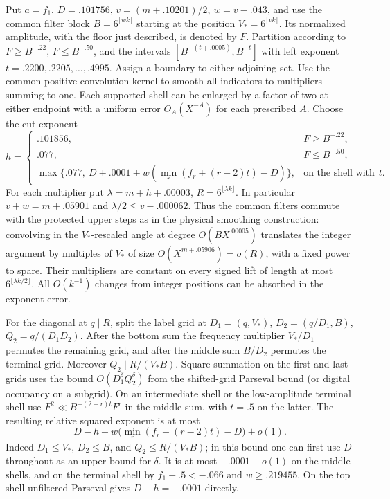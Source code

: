 \documentclass[11pt,a4paper]{article}
\theoremstyle{paperplain}
\numberwithin{equation}{section}
\begin{document}
Put $a=f_1$, $D=.101756$, $v=(m+.10201)/2$, $w=v-.043$, and use
the common filter block $B=6^{\lfloor wk\rfloor}$ starting at the
position $V_*=6^{\lfloor vk\rfloor}$. Its normalized amplitude,
with the floor just described, is denoted by $F$. Partition according
to $F\ge B^{-.22}$, $F\le B^{-.50}$, and the intervals
$[B^{-(t+.0005)},B^{-t}]$ with left exponent
$t=.2200,.2205,\ldots,.4995$. Assign a boundary to either adjoining
set. Use the common positive convolution kernel to smooth all
indicators to multipliers summing to one. Each supported shell can be
enlarged by a factor of two at either endpoint with a uniform error
$O_A(X^{-A})$ for each prescribed $A$. Choose the cut exponent
\[
 h=
 \begin{cases}
 .101856,& F\ge B^{-.22},\\
 .077,& F\le B^{-.50},\\
 \max\{.077,\ D+.0001+
  w(\min_r(f_r+(r-2)t)-D)\},&\text{on the shell with left exponent }t .
 \end{cases}
\]
For each multiplier put $\lambda=m+h+.00003$,
$R=6^{\lfloor\lambda k\rfloor}$. In particular $v+w=m+.05901$
and $\lambda/2\le v-.000062$. Thus the common filters commute with the
protected upper steps as in the physical smoothing construction:
convolving in the $V_*$-rescaled angle at degree $O(BX^{.00005})$
translates the integer argument by multiples of $V_*$ of size
$O(X^{m+.05906})=o(R)$, with a fixed power to spare. Their
multipliers are constant on every signed lift of length at most
$6^{\lfloor\lambda k/2\rfloor}$. All $O(k^{-1})$ changes from
integer positions can be absorbed in the exponent error.

For the diagonal at $q\mid R$, split the label grid at
$D_1=(q,V_*)$, $D_2=(q/D_1,B)$, $Q_2=q/(D_1D_2)$.
After the bottom sum the frequency multiplier $V_*/D_1$ permutes
the remaining grid, and after the middle sum $B/D_2$ permutes the
terminal grid. Moreover $Q_2\mid R/(V_*B)$. Square summation on
the first and last grids uses the bound $O(D_1^\delta Q_2^\delta)$
from the shifted-grid Parseval bound (or digital occupancy on a
subgrid). On an intermediate shell or the low-amplitude terminal
shell use $F^2\ll B^{-(2-r)t}F^r$ in the middle sum, with
$t=.5$ on the latter. The resulting relative squared exponent is
at most
\[
 D-h+w\bigl(\min_r(f_r+(r-2)t)-D\bigr)+o(1).
\]
Indeed $D_1\le V_*$, $D_2\le B$, and $Q_2\le R/(V_*B)$; in this
bound one can first use $D$ throughout as an upper bound for
$\delta$. It is at most $-.0001+o(1)$ on the middle shells, and
on the terminal shell by $f_1-.5<-.066$ and $w\ge.219455$.
On the top shell unfiltered Parseval gives $D-h=-.0001$ directly.
\end{document}
